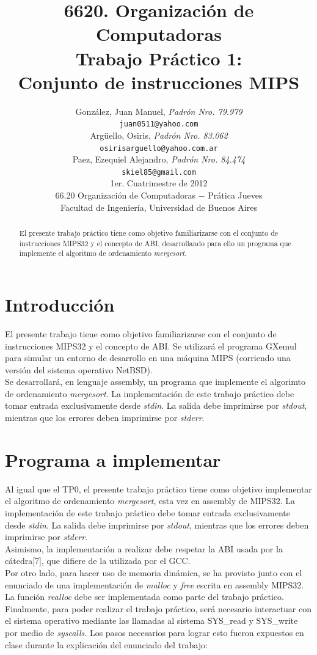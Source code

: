 \documentclass[a4paper,10pt]{article}
\title{ \textbf{ 6620. Organizaci\'on de Computadoras\\
Trabajo Pr\'actico 1: \\
Conjunto de instrucciones MIPS}}
\author{	Gonz\'alez, Juan Manuel, \textit{Padr\'on Nro. 79.979} \\
            	\texttt{ juan0511@yahoo.com } \\[2.5ex]
            	Arg\"uello, Osiris, \textit{Padr\'on Nro. 83.062} \\
            	\texttt{ osirisarguello@yahoo.com.ar } \\[2.5ex]
		Paez, Ezequiel Alejandro, \textit{Padr\'on Nro. 84.474} \\
		\texttt{ skiel85@gmail.com } \\[2.5ex]
            	\normalsize{1er. Cuatrimestre de 2012} \\
            	\normalsize{66.20 Organizaci\'on de Computadoras  $-$ Pr\'atica Jueves} \\
            	\normalsize{Facultad de Ingenier\'ia, Universidad de Buenos Aires} \\
       }
\date{}
\begin{document}
\maketitle
\thispagestyle{empty}  %

\begin{abstract}
El presente trabajo pr\'actico tiene como objetivo familiarizarse con el conjunto de instrucciones MIPS32 y el concepto de ABI, desarrollando para ello un programa que implemente el algoritmo de ordenamiento \textit{mergesort}.
\end{abstract}

\pagebreak

\setcounter{page}{2}
\section{Introducci\'on}
El presente trabajo tiene como objetivo familiarizarse con el conjunto de instrucciones MIPS32 y el concepto de ABI. Se utilizar\'a el programa GXemul para simular un entorno de desarrollo en una m\'aquina MIPS (corriendo una versi\'on del sistema operativo NetBSD).\\
Se desarrollar\'a, en lenguaje assembly, un programa que implemente el algorimto de ordenamiento \textit{mergesort}. La implementaci\'on de este trabajo pr\'actico debe tomar entrada exclusivamente desde \textit{stdin}. La salida debe imprimirse por \textit{stdout}, mientras que los errores deben imprimirse por \textit{stderr}.\\

\section{Programa a implementar}
Al igual que el TP0, el presente trabajo pr\'actico tiene como objetivo implementar el algoritmo de ordenamiento \textit{mergesort}, esta vez en assembly de MIPS32. La implementaci\'on de este trabajo pr\'actico debe tomar entrada exclusivamente desde \textit{stdin}. La salida debe imprimirse por \textit{stdout}, mientras que los errores deben imprimirse por \textit{stderr}.\\
Asimismo, la implementaci\'on a realizar debe respetar la ABI usada por la c\'atedra[7], que difiere de la utilizada por el GCC.\\
Por otro lado, para hacer uso de memoria din\'amica, se ha provisto junto con el enunciado de una implementaci\'on de \textit{malloc} y \textit{free} escrita en assembly MIPS32. La funci\'on \textit{realloc} debe ser implementada como parte del trabajo pr\'actico.\\
Finalmente, para poder realizar el trabajo pr\'actico, ser\'a necesario interactuar con el sistema operativo mediante las llamadas al sistema SYS\_read y SYS\_write por medio de \textit{syscalls}. Los pasos necesarios para lograr esto fueron expuestos en clase durante la explicaci\'on del enunciado del trabajo:
\end{document}
